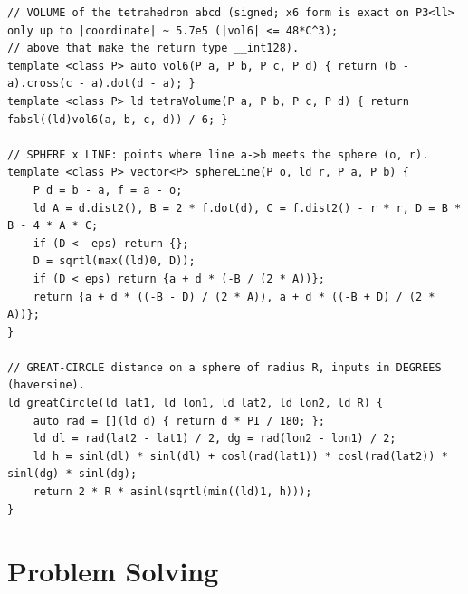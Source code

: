 \documentclass[9pt,a4paper,twocolumn]{extarticle}
\begin{document}
\begin{lstlisting}
// VOLUME of the tetrahedron abcd (signed; x6 form is exact on P3<ll> only up to |coordinate| ~ 5.7e5 (|vol6| <= 48*C^3);
// above that make the return type __int128).
template <class P> auto vol6(P a, P b, P c, P d) { return (b - a).cross(c - a).dot(d - a); }
template <class P> ld tetraVolume(P a, P b, P c, P d) { return fabsl((ld)vol6(a, b, c, d)) / 6; }

// SPHERE x LINE: points where line a->b meets the sphere (o, r).
template <class P> vector<P> sphereLine(P o, ld r, P a, P b) {
    P d = b - a, f = a - o;
    ld A = d.dist2(), B = 2 * f.dot(d), C = f.dist2() - r * r, D = B * B - 4 * A * C;
    if (D < -eps) return {};
    D = sqrtl(max((ld)0, D));
    if (D < eps) return {a + d * (-B / (2 * A))};
    return {a + d * ((-B - D) / (2 * A)), a + d * ((-B + D) / (2 * A))};
}

// GREAT-CIRCLE distance on a sphere of radius R, inputs in DEGREES (haversine).
ld greatCircle(ld lat1, ld lon1, ld lat2, ld lon2, ld R) {
    auto rad = [](ld d) { return d * PI / 180; };
    ld dl = rad(lat2 - lat1) / 2, dg = rad(lon2 - lon1) / 2;
    ld h = sinl(dl) * sinl(dl) + cosl(rad(lat1)) * cosl(rad(lat2)) * sinl(dg) * sinl(dg);
    return 2 * R * asinl(sqrtl(min((ld)1, h)));
}
\end{lstlisting}

\section{Problem Solving}

\filbreak
\end{document}
